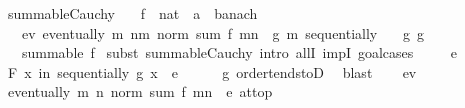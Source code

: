 \begin{isabellebody}
\isanewline
{}\isamarkupfalse%
%
\endisatagproof
{\isafoldproof}%
%
\isadelimproof
\isanewline
%
\endisadelimproof
\isanewline
{}\isamarkupfalse%
\ summable{\isacharunderscore}{\kern0pt}Cauchy{\isacharprime}{\kern0pt}{\isacharcolon}{\kern0pt}\isanewline
\ \ \ f\ {\isacharcolon}{\kern0pt}{\isacharcolon}{\kern0pt}\ {\isachardoublequoteopen}nat\ {\isasymRightarrow}\ {\isacharprime}{\kern0pt}a\ {\isacharcolon}{\kern0pt}{\isacharcolon}{\kern0pt}\ banach{\isachardoublequoteclose}\isanewline
\ \ \ ev{\isacharcolon}{\kern0pt}\ {\isachardoublequoteopen}eventually\ {\isacharparenleft}{\kern0pt}{\isasymlambda}m{\isachardot}{\kern0pt}\ {\isasymforall}n{\isasymge}m{\isachardot}{\kern0pt}\ norm\ {\isacharparenleft}{\kern0pt}sum\ f\ {\isacharbraceleft}{\kern0pt}m{\isachardot}{\kern0pt}{\isachardot}{\kern0pt}{\isacharless}{\kern0pt}n{\isacharbraceright}{\kern0pt}{\isacharparenright}{\kern0pt}\ {\isasymle}\ g\ m{\isacharparenright}{\kern0pt}\ sequentially{\isachardoublequoteclose}\isanewline
\ \ \ g{}{\isacharcolon}{\kern0pt}\ {\isachardoublequoteopen}g\ {\isasymlonglonglongrightarrow}\ {}{\isachardoublequoteclose}\isanewline
\ \ \ {\isachardoublequoteopen}summable\ f{\isachardoublequoteclose}\isanewline
%
\isadelimproof
%
\endisadelimproof
%
\isatagproof
{}\isamarkupfalse%
\ {\isacharparenleft}{\kern0pt}subst\ summable{\isacharunderscore}{\kern0pt}Cauchy{\isacharcomma}{\kern0pt}\ intro\ allI\ impI{\isacharcomma}{\kern0pt}\ goal{\isacharunderscore}{\kern0pt}cases{\isacharparenright}{\kern0pt}\isanewline
\ \ \isamarkupfalse%
\ {\isacharparenleft}{\kern0pt}{}\ e{\isacharparenright}{\kern0pt}\isanewline
\ \ \isamarkupfalse%
\ \isamarkupfalse%
\ {\isachardoublequoteopen}{\isasymforall}\isactrlsub F\ x\ in\ sequentially{\isachardot}{\kern0pt}\ g\ x\ {\isacharless}{\kern0pt}\ e{\isachardoublequoteclose}\isanewline
\ \ \ \ \isamarkupfalse%
\ g{}\ order{\isacharunderscore}{\kern0pt}tendstoD{\isacharparenleft}{\kern0pt}{}{\isacharparenright}{\kern0pt}\ \isamarkupfalse%
\ blast\isanewline
\ \ \isamarkupfalse%
\ ev\ \isamarkupfalse%
\ {\isachardoublequoteopen}eventually\ {\isacharparenleft}{\kern0pt}{\isasymlambda}m{\isachardot}{\kern0pt}\ {\isasymforall}n{\isachardot}{\kern0pt}\ norm\ {\isacharparenleft}{\kern0pt}sum\ f\ {\isacharbraceleft}{\kern0pt}m{\isachardot}{\kern0pt}{\isachardot}{\kern0pt}{\isacharless}{\kern0pt}n{\isacharbraceright}{\kern0pt}{\isacharparenright}{\kern0pt}\ {\isacharless}{\kern0pt}\ e{\isacharparenright}{\kern0pt}\ at{\isacharunderscore}{\kern0pt}top{\isachardoublequoteclose}\isanewline

\end{isabellebody}
